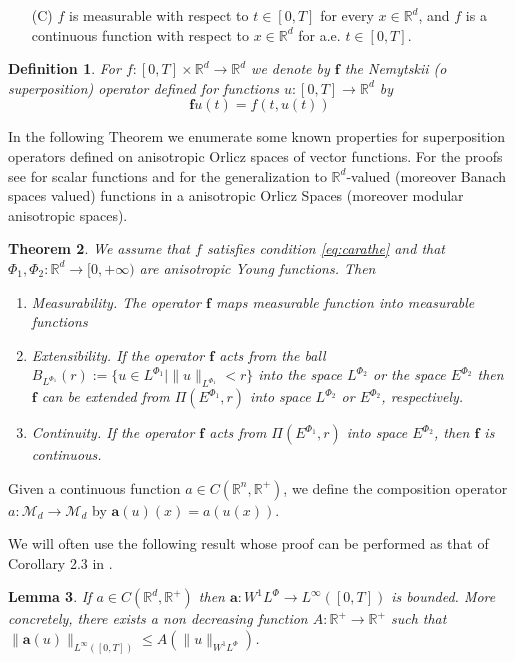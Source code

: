 \documentclass[twoside]{article}
\makeatletter
\newtheorem{thm}{Theorem}[section]
\newtheorem{lem}[thm]{Lemma}
\newtheorem{defi}[thm]{Definition}
\theoremstyle{remark}
\def\namedlabel#1#2{\begingroup
    #2%
    \def\@currentlabel{#2}%
    \phantomsection\label{#1}\endgroup
}
\newcommand{\lphi}{L^{\Phi}}
\newcommand{\wphi}{W^{1}\lphi}
\renewcommand{\b}[1]{\boldsymbol{#1}}
\newcommand{\rr}{\mathbb{R}}
\renewcommand{\leq}{\leqslant}
\makeatother
\begin{document}
\begin{enumerate}
 \item[\namedlabel{eq:carathe}{(C)}] $f$ is measurable with respect to $t\in [0,T]$ for every  $x\in\rr^d$, and $f$ is a continuous function with  respect to  $x\in\rr^d$ for a.e. $t \in [0,T]$.
\end{enumerate}




\begin{defi}
 For $f:[0,T]\times \rr^d\to\rr^d$  we denote by $\b{f}$ the Nemytskii (o superposition) operator defined for functions $u:[0,T]\to\rr^d$ by
\[\b{f}u(t)=f(t,u(t))\]
\end{defi}

In the following Theorem we enumerate  some known properties for superposition operators defined on anisotropic Orlicz spaces of vector functions.   For the proofs see \cite{krasnosel2011integral} for scalar functions  and
\cite{zbMATH04038592,zbMATH03983966,zbMATH03942215} for the generalization to  $\mathbb{R}^d$-valued  (moreover Banach spaces valued)  functions in a anisotropic Orlicz Spaces (moreover modular anisotropic spaces).

\begin{thm} We assume that $f$ satisfies condition \eqref{eq:carathe} and that $\Phi_1,\Phi_2:\rr^d\to [0,+\infty)$ are anisotropic Young functions. Then
\begin{enumerate}
 \item\label{it:measure}\emph{Measurability.}  The operator $\b{f}$ maps  measurable function into measurable functions
 \item\label{it:exten}\emph{Extensibility.}  If the operator $\b{f}$ acts from the ball $B_{L^{\Phi_1}}(r):=\{ u\in L^{\Phi_1}| \|u\|_{L^{\Phi_1}}<r\}$ into the space $L^{\Phi_2}$ or the space $E^{\Phi_2}$ then $\b{f}$ can be extended  from $\Pi(E^{\Phi_1},r)$ into space $L^{\Phi_2}$ or  $E^{\Phi_2}$, respectively.
 \item\label{it:exten}\emph{Continuity.} If the operator $\b{f}$ acts from $\Pi(E^{\Phi_1},r)$ into space $E^{\Phi_2}$, then $\b{f}$ is continuous.
\end{enumerate}
\end{thm}



Given a continuous function $a\in C(\mathbb{R}^n,\mathbb{R}^+)$, we define the composition operator $a:\mathcal{M}_d\to \mathcal{M}_d$ by $\b{a}(u)(x)= a(u(x))$.

We will often use the following result whose proof can be performed as that of  Corollary 2.3 in \cite{ABGMS2015}. 
\begin{lem}\label{lem:cota-a}
\label{a_bound} If $a\in C(\mathbb{R}^d,\mathbb{R}^+)$ then $\b{a}:\wphi\to L^{\infty}([0,T])$ is bounded. 
More concretely,  there exists a non decreasing function $A:\mathbb{R}^+\to\mathbb{R}^+$ such that
 $\|\b{a}(u)\|_{L^{\infty}([0,T])}\leq A(\|u\|_{\wphi})$.
\end{lem}
\end{document}
